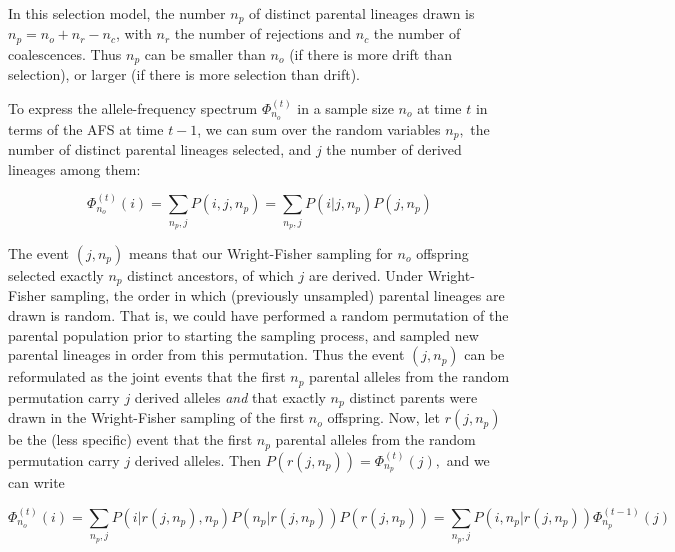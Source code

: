 \documentclass[review]{elsarticle}
\newcommand{\afs}[2]{\Phi_{#1}^{(#2)}}
\begin{document}

In this selection model, the number $n_p$ of distinct parental lineages drawn
is $n_p = n_o+n_r-n_c$, with $n_r$ the number of rejections and $n_c$ the
number of coalescences.  Thus $n_p$ can be smaller than $n_o$ (if there is more
drift than selection), or larger (if there is more selection than drift). 

To express the allele-frequency spectrum $\afs{n_o}{t}$ in a sample size $n_o$
at time $t$ in terms of the AFS at time $t-1$, we can sum over the random variables $n_p,$ the number of distinct
parental lineages selected, and $j$ the number of derived lineages among them:

\begin{equation}
\afs{n_o}{t}(i)=\sum_{n_p,j} P(i,j,n_p) = 
 \sum_{n_p,j} P(i | j,n_p) P(j,n_p)
\end{equation}

The event $(j,n_p)$ means that our Wright-Fisher sampling for $n_o$ offspring
selected exactly $n_p$ distinct ancestors, of which $j$ are derived. Under
Wright-Fisher sampling, the order in which (previously unsampled) parental
lineages are drawn is random. That is, we could have performed a random
permutation of the parental population prior to starting the sampling process,
and sampled new parental lineages in order from this permutation. Thus the
event $(j,n_p)$ can be reformulated as the joint events that the first $n_p$
parental alleles from the random permutation carry $j$ derived alleles
\textit{and} that exactly $n_p$ distinct parents were drawn in the
Wright-Fisher sampling of the first $n_o$ offspring. Now, let $r(j,n_p)$ be the
(less specific) event that the first $n_p$ parental alleles from the random
permutation carry $j$ derived alleles. Then $P(r(j,n_p)) =\afs{n_p}{t} (j),$
and we can write

\begin{equation}
\afs{n_o}{t}(i) = \sum_{n_p,j} P(i | r(j,n_p), n_p)  P(n_p | r(j,n_p) ) P(r(j,n_p)) 
    = \sum_{n_p,j} P(i,n_p | r(j,n_p))  \afs{n_p}{t-1}(j)
\end{equation}
\end{document}

